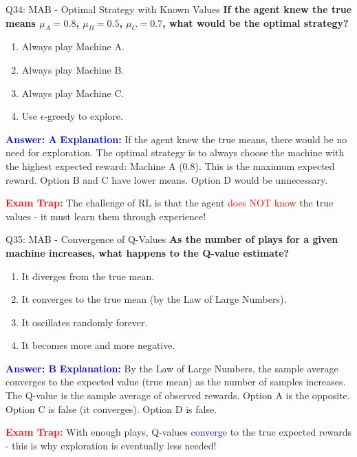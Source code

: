 \documentclass[8pt]{beamer}
\begin{document}
	\begin{frame}{Q34: MAB - Optimal Strategy with Known Values}
		\fontsize{6.5}{7.5}\selectfont
		\textbf{If the agent knew the true means $\mu_A = 0.8$, $\mu_B = 0.5$, $\mu_C = 0.7$, what would be the optimal strategy?}
		
		\begin{enumerate}
			\item Always play Machine A.
			\item Always play Machine B.
			\item Always play Machine C.
			\item Use $\epsilon$-greedy to explore.
		\end{enumerate}
		
		\vspace{0.1cm}
		\textcolor{blue}{\textbf{Answer: A}}
		\vspace{0.1cm}
		\textcolor{blue}{\textbf{Explanation:}} If the agent knew the true means, there would be no need for exploration. The optimal strategy is to always choose the machine with the highest expected reward: Machine A (0.8). This is the maximum expected reward. Option B and C have lower means. Option D would be unnecessary.
		
		\textcolor{red}{\textbf{Exam Trap:}} The challenge of RL is that the agent \textcolor{red}{does NOT know} the true values - it must learn them through experience!
	\end{frame}
	
	\begin{frame}{Q35: MAB - Convergence of Q-Values}
		\fontsize{6.5}{7.5}\selectfont
		\textbf{As the number of plays for a given machine increases, what happens to the Q-value estimate?}
		
		\begin{enumerate}
			\item It diverges from the true mean.
			\item It converges to the true mean (by the Law of Large Numbers).
			\item It oscillates randomly forever.
			\item It becomes more and more negative.
		\end{enumerate}
		
		\vspace{0.1cm}
		\textcolor{blue}{\textbf{Answer: B}}
		\vspace{0.1cm}
		\textcolor{blue}{\textbf{Explanation:}} By the Law of Large Numbers, the sample average converges to the expected value (true mean) as the number of samples increases. The Q-value is the sample average of observed rewards. Option A is the opposite. Option C is false (it converges). Option D is false.
		
		\textcolor{red}{\textbf{Exam Trap:}} With enough plays, Q-values \textcolor{blue}{converge} to the true expected rewards - this is why exploration is eventually less needed!
	\end{frame}
	
\end{document}
